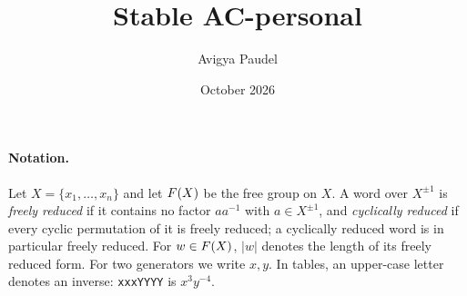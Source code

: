 

\title{Stable AC-personal}
\author{Avigya Paudel}
\date{October 2026}



\maketitle

\paragraph{Notation.} Let $X=\{x_1,\dots,x_n\}$ and let $F(X)$ be the free group on $X$. A word over
$X^{\pm1}$ is \emph{freely reduced} if it contains no factor $aa^{-1}$ with $a\in X^{\pm1}$, and \emph{cyclically
reduced} if every cyclic permutation of it is freely reduced; a cyclically reduced
word is in particular freely reduced. For $w\in F(X)$, $|w|$ denotes the length of its freely reduced form. For two generators we write $x,y$. In tables, an upper-case letter denotes an inverse: \texttt{xxxYYYY}
is $x^3y^{-4}$.








\appendix





